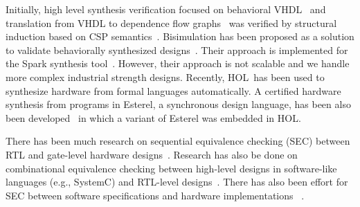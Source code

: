 Initially, high level synthesis verification focused on behavioral VHDL~\cite{19} and 
translation from VHDL to dependence flow graphs~\cite{21} was verified by structural induction
based on CSP semantics~\cite{22}. 
Bisimulation has been proposed as a solution to validate behaviorally synthesized designs~\cite{kundu2008}.  
Their approach is implemented for the Spark synthesis tool~\cite{spark}.
However, their approach is not scalable and we handle more complex industrial strength designs. 
Recently, HOL~\cite{23}has been used to synthesize hardware from formal
languages automatically.  A certified hardware
synthesis from programs in Esterel, a synchronous design language, has been also
been developed~\cite{24} in which a variant of Esterel was embedded in HOL.


There has been much research on sequential equivalence checking (SEC) between
RTL and gate-level hardware designs~\cite{33, 34}. Research has also be done on combinational
equivalence checking between high-level designs in software-like languages (e.g.,
SystemC) and RTL-level designs~\cite{hu}. There has also been effort for SEC between software
specifications and hardware implementations~\cite{36} .



